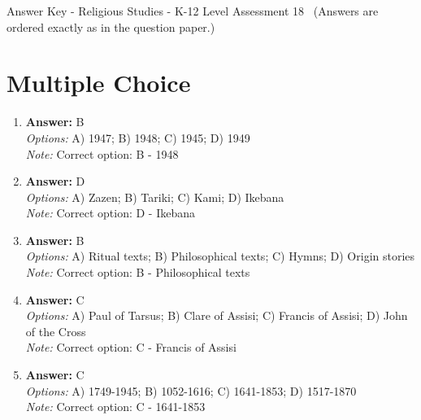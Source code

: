 \documentclass[12pt]{article}
\begin{document}
\begin{center}
Answer Key - Religious Studies - K-12 Level Assessment 18 \
\small (Answers are ordered exactly as in the question paper.)
\end{center}

\section*{Multiple Choice}
\begin{enumerate}[label=\arabic*.]
\item \textbf{Answer:} B
\\ \textit{Options:} A) 1947; B) 1948; C) 1945; D) 1949
\\ \textit{Note:} Correct option: B - 1948
\item \textbf{Answer:} D
\\ \textit{Options:} A) Zazen; B) Tariki; C) Kami; D) Ikebana
\\ \textit{Note:} Correct option: D - Ikebana
\item \textbf{Answer:} B
\\ \textit{Options:} A) Ritual texts; B) Philosophical texts; C) Hymns; D) Origin stories
\\ \textit{Note:} Correct option: B - Philosophical texts
\item \textbf{Answer:} C
\\ \textit{Options:} A) Paul of Tarsus; B) Clare of Assisi; C) Francis of Assisi; D) John of the Cross
\\ \textit{Note:} Correct option: C - Francis of Assisi
\item \textbf{Answer:} C
\\ \textit{Options:} A) 1749-1945; B) 1052-1616; C) 1641-1853; D) 1517-1870
\\ \textit{Note:} Correct option: C - 1641-1853
\end{enumerate}
\end{document}

